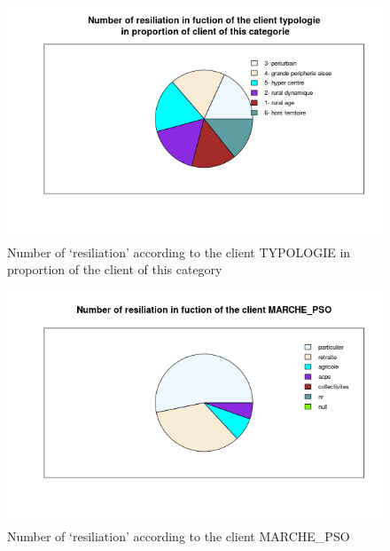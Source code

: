 \documentclass[a4paper, 11pt]{article}
\begin{document}
    \begin{figure}[!ht]
    	\centering
            \includegraphics[height = 10 cm]{Valentin/Number_of_resiliation_in_fuction_of_the_client_typologie_proportion.png}
            \caption{Number of `resiliation' according to the client TYPOLOGIE in proportion of the client of this category}
            \label{fig:resiliation_typo2}
    \end{figure}
    
            \begin{figure}[!ht]
    	\centering
            \includegraphics[height = 10 cm]{Valentin/Number_of_resiliation_in_fuction_of_the_client_MARCHE_PSO.png}
            \caption{Number of `resiliation' according to the client MARCHE\_PSO}
            \label{fig:resiliation_pso1}
    \end{figure}
    
\end{document}
